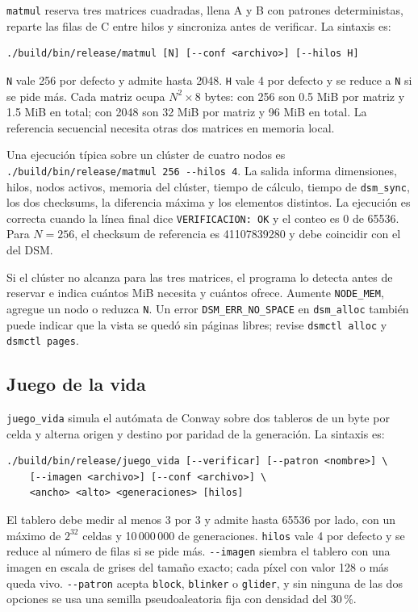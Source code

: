 \texttt{matmul} reserva tres matrices cuadradas, llena A y B con patrones deterministas, reparte las filas de C entre hilos y sincroniza antes de verificar. La sintaxis es:

\begin{lstlisting}
./build/bin/release/matmul [N] [--conf <archivo>] [--hilos H]
\end{lstlisting}

\texttt{N} vale 256 por defecto y admite hasta 2048. \texttt{H} vale 4 por defecto y se reduce a \texttt{N} si se pide más. Cada matriz ocupa $N^2 \times 8$ bytes: con 256 son 0.5 MiB por matriz y 1.5 MiB en total; con 2048 son 32 MiB por matriz y 96 MiB en total. La referencia secuencial necesita otras dos matrices en memoria local.

Una ejecución típica sobre un clúster de cuatro nodos es \texttt{./build/bin/release/matmul 256 -{}-hilos 4}. La salida informa dimensiones, hilos, nodos activos, memoria del clúster, tiempo de cálculo, tiempo de \texttt{dsm\_sync}, los dos checksums, la diferencia máxima y los elementos distintos. La ejecución es correcta cuando la línea final dice \texttt{VERIFICACION: OK} y el conteo es 0 de 65536. Para $N=256$, el checksum de referencia es 41107839280 y debe coincidir con el del DSM.

Si el clúster no alcanza para las tres matrices, el programa lo detecta antes de reservar e indica cuántos MiB necesita y cuántos ofrece. Aumente \texttt{NODE\_MEM}, agregue un nodo o reduzca \texttt{N}. Un error \texttt{DSM\_ERR\_NO\_SPACE} en \texttt{dsm\_alloc} también puede indicar que la vista se quedó sin páginas libres; revise \texttt{dsmctl alloc} y \texttt{dsmctl pages}.

\subsection{Juego de la vida}\label{subsec:juego-vida}

\texttt{juego\_vida} simula el autómata de Conway sobre dos tableros de un byte por celda y alterna origen y destino por paridad de la generación. La sintaxis es:

\begin{lstlisting}
./build/bin/release/juego_vida [--verificar] [--patron <nombre>] \
    [--imagen <archivo>] [--conf <archivo>] \
    <ancho> <alto> <generaciones> [hilos]
\end{lstlisting}

El tablero debe medir al menos 3 por 3 y admite hasta 65536 por lado, con un máximo de $2^{32}$ celdas y 10\,000\,000 de generaciones. \texttt{hilos} vale 4 por defecto y se reduce al número de filas si se pide más. \texttt{-{}-imagen} siembra el tablero con una imagen en escala de grises del tamaño exacto; cada píxel con valor 128 o más queda vivo. \texttt{-{}-patron} acepta \texttt{block}, \texttt{blinker} o \texttt{glider}, y sin ninguna de las dos opciones se usa una semilla pseudoaleatoria fija con densidad del 30\,\%.

